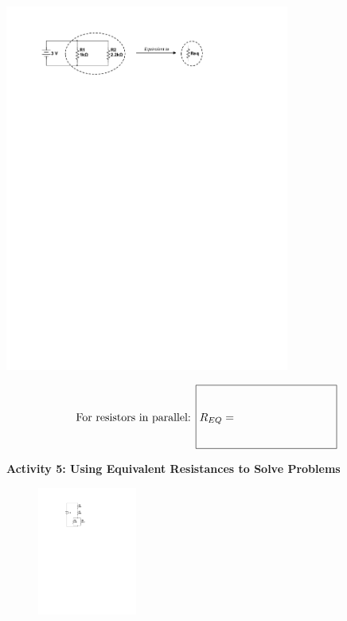 \begin{center}
\includegraphics[width=0.7\textwidth]{electric_circuits2/parallel_equiv_bw.pdf}
\answerspace{1 in}
\end{center}

\begin{displaymath}
\textrm{For resistors in parallel: } \boxed{R_{EQ} = \phantom{\rule[-0.3in]{1.2in}{.7in}}} 
\end{displaymath}

\textbf{Activity 5: Using Equivalent Resistances to Solve Problems}

\begin{figure}
    \vspace{-0.3 in}
    \includegraphics[width=0.29\textwidth]{electric_circuits2/circ_diag6_bw.pdf}
\end{figure}

